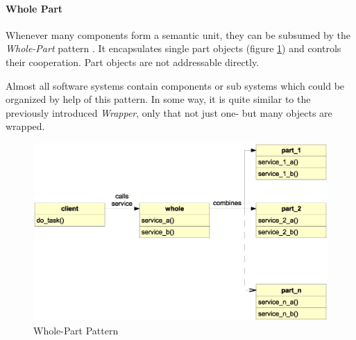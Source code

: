 %
%
%
%
%
%
%

\paragraph{Whole Part}
\label{whole_part_heading}

Whenever many components form a semantic unit, they can be subsumed by the
\emph{Whole-Part} pattern \cite{buschmann}. It encapsulates single part objects
(figure \ref{wholepart_figure}) and controls their cooperation. Part objects
are not addressable directly.

Almost all software systems contain components or sub systems which could be
organized by help of this pattern. In some way, it is quite similar to the
previously introduced \emph{Wrapper}, only that not just one- but many objects
are wrapped.

\begin{figure}[ht]
    \begin{center}
        \includegraphics[scale=0.3]{vector/wholepart.eps}
        \caption{Whole-Part Pattern}
        \label{wholepart_figure}
    \end{center}
\end{figure}
